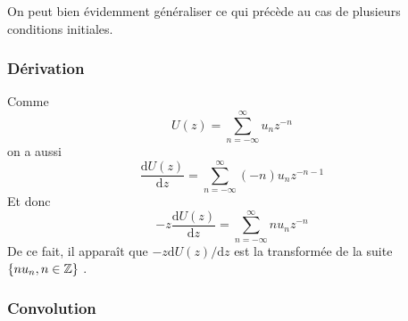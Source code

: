 \begin{proposition}
{On peut bien \'{e}videmment g\'{e}n\'{e}raliser ce qui pr\'{e}c\`{e}de au cas de plusieurs conditions initiales.

%
%
%
%
%
%
%
\subsubsection{D\'{e}rivation}
Comme
$$
U(z)=\sum_{n=-\infty}^{\infty}u_{n}z^{-n}
$$
on a aussi
$$
\frac{\mathrm{d}U(z)}{\mathrm{d}z}=\sum_{n=-\infty}^{\infty}(-n)u_{n}z^{-n-1}
$$
Et donc
$$
-z\frac{\mathrm{d}U(z)}{\mathrm{d}z}=\sum_{n=-\infty}^{\infty}nu_{n}z^{-n}
$$
De ce fait, il appara\^{i}t que $-z\mathrm{d}U(z)/\mathrm{d}z$ est la transform\'{e}e de la suite $\{nu_{n}, n \in \mathbb{Z}\}$ .
%
\subsubsection{Convolution}

}
\end{proposition}
